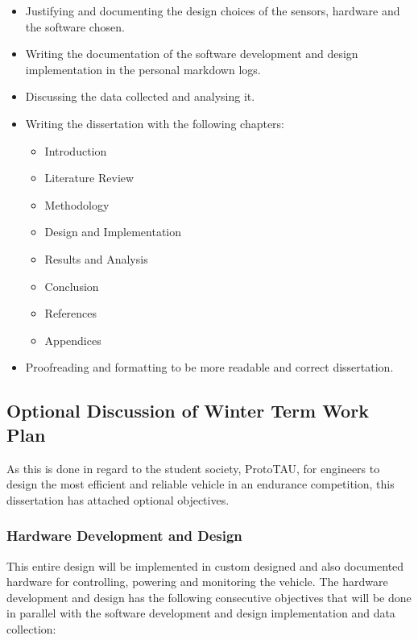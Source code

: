 \documentclass[
  10pt,
]{article}
\providecommand{\tightlist}{%
  \setlength{\itemsep}{0pt}\setlength{\parskip}{0pt}}
\begin{document}
\begin{itemize}
\tightlist
\item
  Justifying and documenting the design choices of the sensors, hardware
  and the software chosen.
\item
  Writing the documentation of the software development and design
  implementation in the personal markdown logs.
\item
  Discussing the data collected and analysing it.
\item
  Writing the dissertation with the following chapters:

  \begin{itemize}
  \tightlist
  \item
    Introduction
  \item
    Literature Review
  \item
    Methodology
  \item
    Design and Implementation
  \item
    Results and Analysis
  \item
    Conclusion
  \item
    References
  \item
    Appendices
  \end{itemize}
\item
  Proofreading and formatting to be more readable and correct
  dissertation.
\end{itemize}

\hypertarget{optional-discussion-of-winter-term-work-plan}{%
\subsection{Optional Discussion of Winter Term Work
Plan}\label{optional-discussion-of-winter-term-work-plan}}

As this is done in regard to the student society, ProtoTAU, for
engineers to design the most efficient and reliable vehicle in an
endurance competition, this dissertation has attached optional
objectives.

\hypertarget{hardware-development-and-design}{%
\subsubsection{Hardware Development and
Design}\label{hardware-development-and-design}}

This entire design will be implemented in custom designed and also
documented hardware for controlling, powering and monitoring the
vehicle. The hardware development and design has the following
consecutive objectives that will be done in parallel with the software
development and design implementation and data collection:
\end{document}
